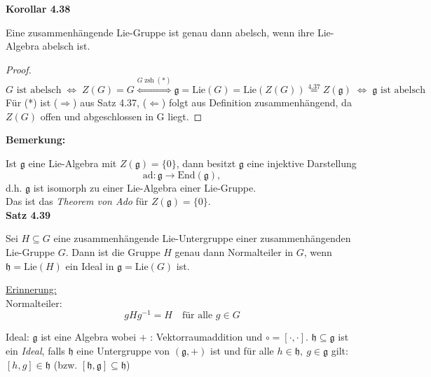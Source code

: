 \documentclass[fleqn, 12pt, letterpaper]{article}
\newcommand{\txt}[1]{\text{#1}}
\begin{document}
\textbf{Korollar 4.38}

Eine zusammenhängende Lie-Gruppe ist genau dann abelsch, wenn ihre Lie-Algebra abelsch ist.
\begin{proof}
\[
G \text{ ist abelsch} \; \Leftrightarrow \; Z(G) = G \overset{G \;\txt{zsh} \;(*)}{\Leftrightarrow} \mathfrak{g}=\mathrm{Lie}(G)=\mathrm{Lie}(Z(G))\overset{4.37}{=}Z(\mathfrak{g}) \;\Leftrightarrow\; \mathfrak{g}\text{ ist abelsch} 
\]
Für (*) ist ($\Rightarrow $) aus Satz 4.37, ($\Leftarrow$) folgt aus Definition zusammenhängend, da $Z(G)$ offen und abgeschlossen in G liegt.
\end{proof}

\textbf{Bemerkung:}

Ist \( \mathfrak{g} \) eine Lie-Algebra mit \( Z(\mathfrak{g}) = \{0\} \), dann besitzt \( \mathfrak{g} \) eine injektive Darstellung
\[
\mathrm{ad} \colon \mathfrak{g} \rightarrow \mathrm{End}(\mathfrak{g}),
\]
d.h. \( \mathfrak{g} \) ist isomorph zu einer Lie-Algebra einer Lie-Gruppe. \\

\smallskip
 Das ist das \emph{Theorem von Ado} für \( Z(\mathfrak{g}) = \{0\} \).\\

\textbf{Satz 4.39}

Sei \( H \subseteq G \) eine zusammenhängende Lie-Untergruppe einer zusammenhängenden Lie-Gruppe \( G \). Dann ist die Gruppe \( H \) genau dann Normalteiler in \( G \), wenn \( \mathfrak{h} = \mathrm{Lie}(H) \) ein Ideal in \( \mathfrak{g} = \mathrm{Lie}(G) \) ist.

\underline{Erinnerung:}
\\
Normalteiler:
\[
gHg^{-1} = H \quad \text{für alle } g \in G
\]

Ideal:
\( \mathfrak{g} \) ist eine Algebra wobei \( + \) : Vektorraumaddition und \( \circ=[\cdot,\cdot] \). \( \mathfrak{h} \subseteq \mathfrak{g} \) ist ein \emph{Ideal}, falls \( \mathfrak{h} \) eine Untergruppe von \( (\mathfrak{g}, +) \) ist und für alle \( h \in \mathfrak{h},\ g \in \mathfrak{g} \) gilt: \([h, g] \in \mathfrak{h}\)
(bzw. \([ \mathfrak{h}, \mathfrak{g} ] \subseteq \mathfrak{h}\))
\end{document}
